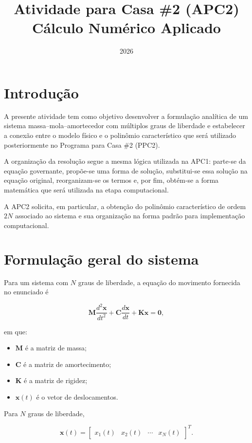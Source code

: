 \documentclass[12pt,a4paper]{article}
\title{\textbf{Atividade para Casa \#2 (APC2)}\\
Cálculo Numérico Aplicado}
\author{}
\date{2026}
\begin{document}
\maketitle

\section*{Introdução}

A presente atividade tem como objetivo desenvolver a formulação analítica de um
sistema massa--mola--amortecedor com múltiplos graus de liberdade e estabelecer
a conexão entre o modelo físico e o polinômio característico que será utilizado
posteriormente no Programa para Casa \#2 (PPC2).

A organização da resolução segue a mesma lógica utilizada na APC1: parte-se da
equação governante, propõe-se uma forma de solução, substitui-se essa solução na
equação original, reorganizam-se os termos e, por fim, obtém-se a forma
matemática que será utilizada na etapa computacional.

A APC2 solicita, em particular, a obtenção do polinômio característico de ordem
$2N$ associado ao sistema e sua organização na forma padrão para implementação
computacional.

\section{Formulação geral do sistema}

Para um sistema com $N$ graus de liberdade, a equação do movimento fornecida no
enunciado é

\begin{equation}
\mathbf{M}\frac{d^2\mathbf{x}}{dt^2}
+
\mathbf{C}\frac{d\mathbf{x}}{dt}
+
\mathbf{K}\mathbf{x}
= \mathbf{0},
\label{eq:movimento}
\end{equation}

em que:

\begin{itemize}
    \item $\mathbf{M}$ é a matriz de massa;
    \item $\mathbf{C}$ é a matriz de amortecimento;
    \item $\mathbf{K}$ é a matriz de rigidez;
    \item $\mathbf{x}(t)$ é o vetor de deslocamentos.
\end{itemize}

Para $N$ graus de liberdade,

\begin{equation}
\mathbf{x}(t)=
\begin{bmatrix}
x_1(t) & x_2(t) & \cdots & x_N(t)
\end{bmatrix}^{T}.
\end{equation}
\end{document}
